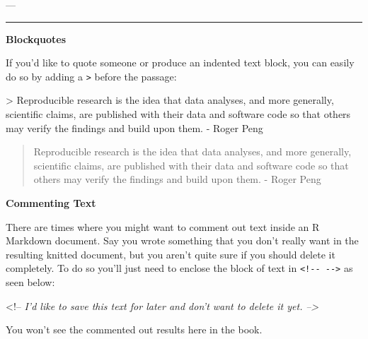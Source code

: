\documentclass[]{tufte-book}
\newenvironment{Shaded}{\begin{snugshade}}{\end{snugshade}}
\newcommand{\DataTypeTok}[1]{\textcolor[rgb]{0.13,0.29,0.53}{{#1}}}
\newcommand{\CommentTok}[1]{\textcolor[rgb]{0.56,0.35,0.01}{\textit{{#1}}}}
\newcommand{\NormalTok}[1]{{#1}}
\begin{document}
\begin{Shaded}
\begin{Highlighting}[]
\NormalTok{---}
\end{Highlighting}
\end{Shaded}

\begin{center}\rule{0.5\linewidth}{\linethickness}\end{center}

\textbf{Blockquotes}

If you'd like to quote someone or produce an indented text block, you
can easily do so by adding a \texttt{\textgreater{}} before the passage:

\begin{Shaded}
\begin{Highlighting}[]
\NormalTok{>}\DataTypeTok{ Reproducible research is the idea that data analyses, and more generally, }
\DataTypeTok{scientific claims, are published with their data and software code so that}
\DataTypeTok{others may verify the findings and build upon them. - Roger Peng}
\end{Highlighting}
\end{Shaded}

\begin{quote}
Reproducible research is the idea that data analyses, and more
generally, scientific claims, are published with their data and software
code so that others may verify the findings and build upon them. - Roger
Peng
\end{quote}

\textbf{Commenting Text}

There are times where you might want to comment out text inside an R
Markdown document. Say you wrote something that you don't really want in
the resulting knitted document, but you aren't quite sure if you should
delete it completely. To do so you'll just need to enclose the block of
text in \texttt{\textless{}!-\/-\ -\/-\textgreater{}} as seen below:

\begin{Shaded}
\begin{Highlighting}[]
\NormalTok{<!--}
\CommentTok{I'd like to save this text for later and don't want to delete it yet.}
\CommentTok{-->}
\end{Highlighting}
\end{Shaded}

You won't see the commented out results here in the book.

\vspace*{0.2in}
\end{document}
